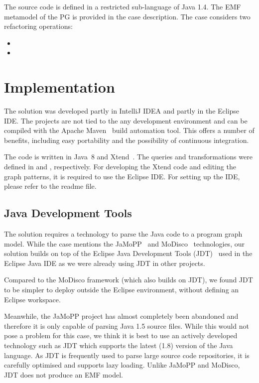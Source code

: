 \documentclass[submission,copyright,creativecommons]{eptcs}
\begin{document}
The source code is defined in a restricted sub-language of Java 1.4. The EMF metamodel of the PG is provided in the case description. The case considers two refactoring operations:

\begin{itemize}[noitemsep]
\item {}
\item {}
\end{itemize}

\section{Implementation}

The solution was developed partly in IntelliJ IDEA and partly in the Eclipse IDE. The projects are not tied to the any development environment and can be compiled with the Apache Maven~\cite{Maven} build automation tool. This offers a number of benefits, including easy portability and the possibility of continuous integration.

The code is written in Java~8 and Xtend~\cite{Xtend}. The queries and transformations were defined in \eiq and \viatra, respectively. For developing the Xtend code and editing the graph patterns, it is required to use the Eclipse IDE. For setting up the IDE, please refer to the readme file. 

\subsection{Java Development Tools}

The solution requires a technology to parse the Java code to a program graph model. While the case mentions the JaMoPP~\cite{JaMoPP} and MoDisco~\cite{MoDisco} technologies, our solution builds on top of the Eclipse Java Development Tools (JDT)~\cite{jdt} used in the Eclipse Java IDE as we were already using JDT in other projects.

Compared to the MoDisco framework (which also builds on JDT), we found JDT to be simpler to deploy outside the Eclipse environment, \ie without defining an Eclipse workspace.

Meanwhile, the JaMoPP project has almost completely been abandoned and therefore it is only capable of parsing Java 1.5 source files. While this would not pose a problem for this case, we think it is best to use an actively developed technology such as JDT which supports the latest (1.8) version of the Java language. As JDT is frequently used to parse large source code repositories, it is carefully optimised and supports lazy loading. Unlike JaMoPP and MoDisco, JDT does not produce an EMF model.
\end{document}
